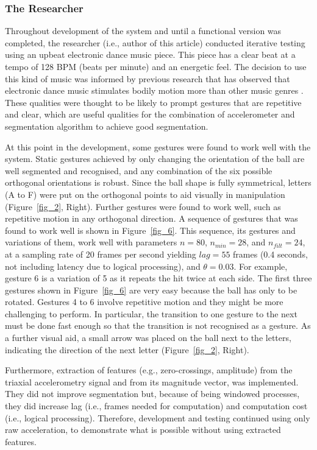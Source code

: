 \documentclass{nime-alternate_MANUSCRIPT} %
\begin{document}
\subsubsection{The Researcher}

Throughout  development of the system and until a functional version was completed, the researcher (i.e., author of this article) conducted iterative testing using an upbeat electronic dance music piece. This piece has a clear beat at a tempo of 128 BPM (beats per minute) and an energetic feel. The decision to use this kind of music was informed by previous research that has observed that electronic dance music stimulates bodily motion more than other music genres \cite{Burger_Toiviainen_2020}. These qualities were thought to be likely to prompt gestures that are repetitive and clear, which are useful qualities for the combination of accelerometer and segmentation algorithm to achieve good segmentation. 

At this point in the development, some gestures were found to work well with the system. Static gestures achieved by only changing the orientation of the ball are well segmented and recognised, and any combination of the six possible orthogonal orientations is robust. Since the ball shape is fully symmetrical, letters (A to F) were put on the orthogonal points to aid visually in manipulation (Figure~\ref{fig_2}, Right). Further gestures were found to work well, such as repetitive motion in any orthogonal direction. A sequence of gestures that was found to work well is shown in Figure~\ref{fig_6}. This sequence, its gestures and variations of them, work well with  parameters $n = 80$, $n_{min} = 28$, and $n_{filt} = 24$, at a sampling rate of 20 frames per second yielding $lag = 55$ frames (0.4 seconds, not including latency due to logical processing), and $\theta = 0.03$. For example, gesture 6 is a variation of 5 as it repeats the hit twice at each side. The first three gestures shown in Figure~\ref{fig_6} are very easy because the ball has only to be rotated. Gestures 4 to 6 involve repetitive motion and they might be more challenging to perform. In particular, the transition to one gesture to the next must be done fast enough so that the transition is not recognised as a gesture. As a further visual aid, a small arrow was placed on the ball next to the letters, indicating the direction of the next letter (Figure~\ref{fig_2}, Right).

Furthermore, extraction of features (e.g., zero-crossings, amplitude) from the triaxial accelerometry signal and from its magnitude vector, was implemented. They did not improve segmentation but,  because of being windowed processes, they did increase lag (i.e., frames needed for computation) and computation cost (i.e., logical processing). Therefore, development and testing continued using only raw acceleration, to demonstrate what is possible without using extracted features. 
	
\end{document}
